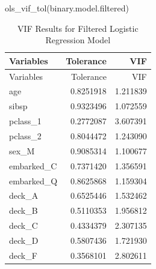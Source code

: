 \documentclass[
  letterpaper,
  DIV=11,
  numbers=noendperiod]{scrartcl}
\newenvironment{Shaded}{\begin{snugshade}}{\end{snugshade}}
\newcommand{\FunctionTok}[1]{\textcolor[rgb]{0.28,0.35,0.67}{#1}}
\newcommand{\NormalTok}[1]{\textcolor[rgb]{0.00,0.23,0.31}{#1}}
\begin{document}
\begin{Shaded}
\begin{Highlighting}[]
\FunctionTok{ols\_vif\_tol}\NormalTok{(binary.model.filtered)}
\end{Highlighting}
\end{Shaded}

\begin{longtable}[]{@{}lrr@{}}
\caption{VIF Results for Filtered Logistic Regression
Model}\tabularnewline
\toprule\noalign{}
Variables & Tolerance & VIF \\
\midrule\noalign{}
\endfirsthead
\toprule\noalign{}
Variables & Tolerance & VIF \\
\midrule\noalign{}
\endhead
\bottomrule\noalign{}
\endlastfoot
age & 0.8251918 & 1.211839 \\
sibsp & 0.9323496 & 1.072559 \\
pclass\_1 & 0.2772087 & 3.607391 \\
pclass\_2 & 0.8044472 & 1.243090 \\
sex\_M & 0.9085314 & 1.100677 \\
embarked\_C & 0.7371420 & 1.356591 \\
embarked\_Q & 0.8625868 & 1.159304 \\
deck\_A & 0.6525446 & 1.532462 \\
deck\_B & 0.5110353 & 1.956812 \\
deck\_C & 0.4334379 & 2.307135 \\
deck\_D & 0.5807436 & 1.721930 \\
deck\_F & 0.3568101 & 2.802611 \\
\end{longtable}
\end{document}
